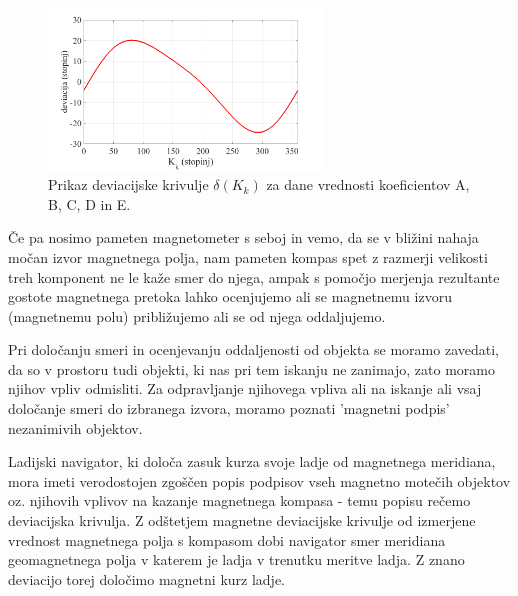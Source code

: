 \begin{figure}[!ht]%
	\vspace{0pt}
	\begin{center}
		\includegraphics[width=0.65\textwidth]{Predavanja/02_KompasnoDolocSmeri/figs/DeviacijaPoPriblFormuli.png}
	\end{center}
	\vspace{0pt}
	\caption{Prikaz deviacijske krivulje $\delta(K_k) $ za dane vrednosti koeficientov A, B, C, D in E.}
	\label{Fig_PrimerDeviacijskeKrivulje}
	\vspace{0pt}
\end{figure}
   

Če pa nosimo pameten magnetometer s seboj in vemo, da se v bližini nahaja močan izvor magnetnega polja, nam pameten kompas spet z razmerji velikosti treh komponent ne le kaže smer do njega, ampak s pomočjo merjenja rezultante gostote magnetnega pretoka lahko ocenjujemo ali se magnetnemu izvoru (magnetnemu polu) približujemo ali se od njega oddaljujemo.


Pri določanju smeri in ocenjevanju oddaljenosti od objekta se moramo zavedati, da so v prostoru tudi objekti, ki nas pri tem iskanju ne zanimajo, zato moramo njihov vpliv odmisliti. Za odpravljanje njihovega vpliva ali na iskanje ali vsaj določanje smeri do izbranega izvora, moramo poznati 'magnetni podpis' nezanimivih objektov. 

Ladijski navigator, ki določa zasuk kurza svoje ladje od magnetnega meridiana, mora imeti verodostojen zgoščen popis podpisov vseh magnetno motečih objektov oz. njihovih vplivov na kazanje magnetnega kompasa - temu popisu rečemo deviacijska krivulja. Z odštetjem magnetne deviacijske krivulje od izmerjene vrednost magnetnega polja s kompasom dobi navigator smer meridiana geomagnetnega polja v katerem je ladja v trenutku meritve ladja. Z znano deviacijo torej določimo magnetni kurz ladje.  

